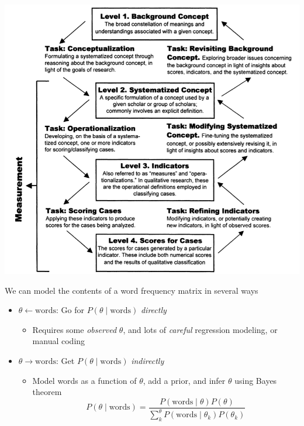 \documentclass[11pt,compress,professionalfonts]{beamer}
\newcommand{\ita}{\begin{itemize}}
\newcommand{\itm}{\item[]}
\newcommand{\itz}{\end{itemize}}
\begin{document}
\centerline{\includegraphics[scale=.45]{pictures/measurement-validity}}

%
%
%
%
%


We can model the contents of a word frequency matrix in several ways
\ita
\itm $\theta \longleftarrow \text{words}$: Go for $P(\theta \mid \text{words})$ \textit{directly}
\ita
\itm Requires some \textit{observed} $\theta$, and lots of \textit{careful} regression modeling, or manual coding
\itz
\itm $\theta \longrightarrow \text{words}$: Get $P(\theta \mid \text{words})$ \textit{indirectly}
\ita
\itm Model words as a function of $\theta$, add a prior, and infer $\theta$ using Bayes theorem
\[
P(\theta \mid \text{words}) = \frac{P(\text{words} \mid \theta)P(\theta)}{\sum^\theta_k P(\text{words} \mid \theta_k)P(\theta_k)}
\]
\itz
\itz 


\end{document}
